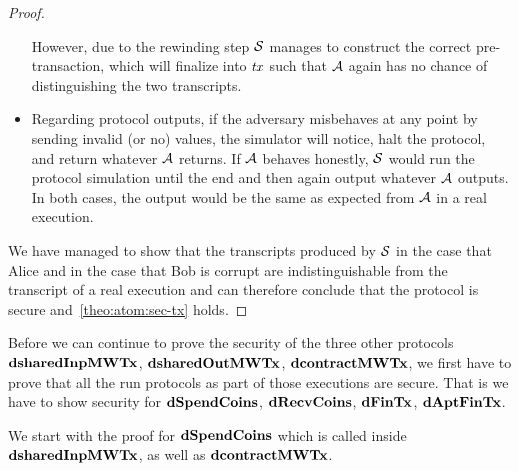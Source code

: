 \begin{proof}
\begin{itemize}
        However, due to the rewinding step $\mathcal{S}$ manages to construct the correct pre-transaction, which will finalize into $\mathit{tx}$ such that $\mathcal{A}$ again has no chance of distinguishing the two transcripts.
        \item Regarding protocol outputs, if the adversary misbehaves at any point by sending invalid (or no) values, the simulator will notice, halt the protocol, and return whatever $\mathcal{A}$ returns.
        If $\mathcal{A}$ behaves honestly, $\mathcal{S}$ would run the protocol simulation until the end and then again output whatever $\mathcal{A}$ outputs.
        In both cases, the output would be the same as expected from $\mathcal{A}$ in a real execution.
    \end{itemize}

    We have managed to show that the transcripts produced by $\mathcal{S}$ in the case that Alice and in the case that Bob is corrupt are indistinguishable from the transcript of a real execution and can therefore conclude that the protocol is secure and~\cref{theo:atom:sec-tx} holds.

\end{proof}

Before we can continue to prove the security of the three other protocols \\$\mathbf{dsharedInpMWTx}$, $\mathbf{dsharedOutMWTx}$, $\mathbf{dcontractMWTx}$, we first have to prove that all the run protocols as part of those executions are secure.
That is we have to show security for $\mathbf{dSpendCoins}$, $\mathbf{dRecvCoins}$, $\mathbf{dFinTx}$, $\mathbf{dAptFinTx}$.

We start with the proof for $\mathbf{dSpendCoins}$ which is called inside $\mathbf{dsharedInpMWTx}$,
as well as $\mathbf{dcontractMWTx}$.

